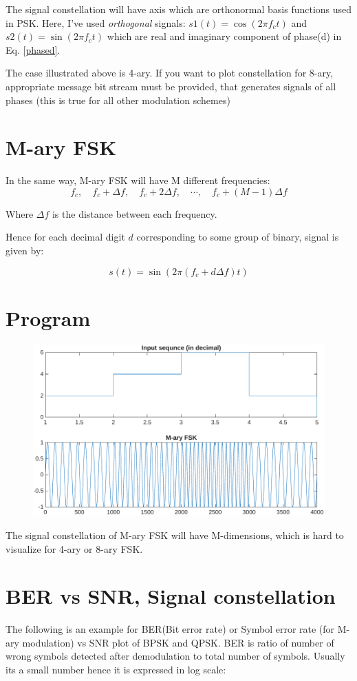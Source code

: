 The signal constellation will have axis which are orthonormal basis functions used in PSK. 
Here, I've used \textit{orthogonal} signals: $s1(t) = \cos(2\pi f_c t)$ and $s2(t) = \sin(2\pi f_c t)$
which are real and imaginary component of phase(d) in Eq. \ref{phased}.

The case illustrated above is 4-ary. If you want to plot constellation for 8-ary, appropriate message bit stream must be provided, that generates signals of all phases (this is true for all other modulation schemes)

\section{M-ary FSK}

In the same way, M-ary FSK will have M different frequencies: $$f_c, \quad f_c + \Delta f, \quad f_c + 2\Delta f, \quad \cdots, \quad f_c + (M-1)\Delta f$$

Where $\Delta f$ is the distance between each frequency.

Hence for each decimal digit $d$ corresponding to some group of binary, signal is given by:

$$s(t) = \sin\left(2\pi (f_c + d \Delta f) t\right)$$

\section*{Program}
\begin{figure}[!ht]
	\centering
	\includegraphics[width=0.8\linewidth]{img/mfsk.pdf}
\end{figure}

The signal constellation of M-ary FSK will have M-dimensions, which is hard to visualize for 4-ary or 8-ary FSK.

\section{BER vs SNR, Signal constellation}
The following is an example for BER(Bit error rate) or Symbol error rate (for M-ary modulation) vs SNR plot of BPSK and QPSK. BER is ratio of number of wrong symbols detected after demodulation to total number of symbols. Usually its a small number hence it is expressed in log scale:

